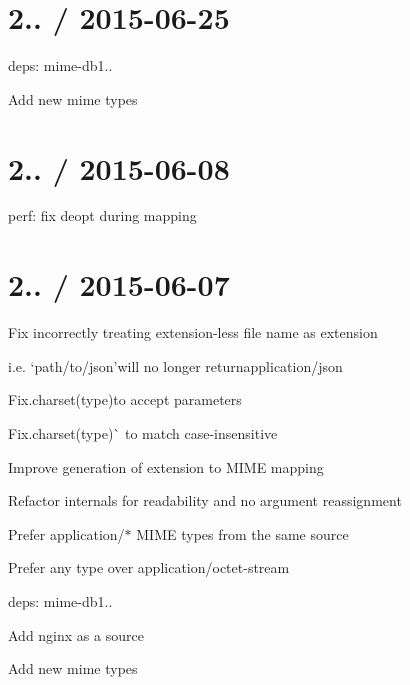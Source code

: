 \section*{2.. / 2015-\/06-\/25 }


\begin{DoxyItemize}
\item deps\+: mime-\/db1..
\begin{DoxyItemize}
\item Add new mime types
\end{DoxyItemize}
\end{DoxyItemize}

\section*{2.. / 2015-\/06-\/08 }


\begin{DoxyItemize}
\item perf\+: fix deopt during mapping
\end{DoxyItemize}

\section*{2.. / 2015-\/06-\/07 }


\begin{DoxyItemize}
\item Fix incorrectly treating extension-\/less file name as extension
\begin{DoxyItemize}
\item i.\+e. `\textquotesingle{}path/to/json'{\ttfamily will no longer return}application/json{\ttfamily }
\end{DoxyItemize}
\item {\ttfamily Fix}.charset(type){\ttfamily to accept parameters}
\item {\ttfamily Fix}.charset(type)\`{} to match case-\/insensitive
\item Improve generation of extension to M\+I\+ME mapping
\item Refactor internals for readability and no argument reassignment
\item Prefer {\ttfamily application/$\ast$} M\+I\+ME types from the same source
\item Prefer any type over {\ttfamily application/octet-\/stream}
\item deps\+: mime-\/db1..
\begin{DoxyItemize}
\item Add nginx as a source
\item Add new mime types
\end{DoxyItemize}
\end{DoxyItemize}

